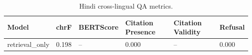 \begin{table}[h]
\centering
\caption{Hindi cross-lingual QA metrics.}
\label{tab:hindi-metrics}
\begin{tabular}{llllll}
\hline
Model & chrF & BERTScore & Citation Presence & Citation Validity & Refusal \\
\hline
retrieval\_only & 0.198 & -- & 0.000 & -- & 0.000 \\
\hline
\end{tabular}
\end{table}